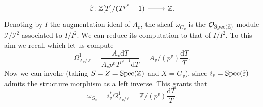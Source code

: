 \begin{ex}[]
\begin{enumerate}
\begin{equation*}
		\begin{tikzcd}[row sep = 0ex
			,/tikz/column 1/.append style={anchor=base east}
			,/tikz/column 2/.append style={anchor=base west}]
			\widetilde{\varepsilon}\colon 
			\mathbb{Z}[T]/ (T^{p^v} - 1)\arrow[r, "", rightarrow] &
			\mathbb{Z}
		.\end{tikzcd}
		\end{equation*} 
		Denoting by $I$ the augmentation ideal of $A_v$,
		the sheaf $\omega_{G_v}$ is the $\mathcal{O}_{ \operatorname{Spec}(\mathbb{Z}) }$-module
		$\mathcal{I}/\mathcal{I}^2$ associated to $I/I^2$.
		We can reduce its computation to that of $I/I^2$.
		To this aim we recall \cite[\S6.1, proposition 1.8(d) and example 1.10]{Liu}
		which let us compute
		\begin{equation*}
			\Omega^1_{A_v/\mathbb{Z}} = \frac{ A_v \mathrm{d}T }{ A_v p^v T^{p^{v-1}} \mathrm{d}T }
			= A_v / (p^v) \frac{ \mathrm{d}T }{ T }
		.\end{equation*}
		Now we can invoke 
		\cite[\href{https://stacks.math.columbia.edu/tag/0474}{Lemma 0474}]{SP}
		(taking $S = Z = \operatorname{Spec}(\mathbb{Z})$ and $X = G_v$),
		since $i_v = \operatorname{Spec}(\widetilde{\varepsilon})$ admits the structure morphism
		as a left inverse.
		This grants that
		\begin{equation*}
		\omega_{G_v} = i_v^* \Omega^1_{A_v/\mathbb{Z}} =
		\mathbb{Z}/ (p^v) \frac{ \mathrm{d}T }{ T }
		.\end{equation*}
		

\end{enumerate}
\end{ex}
